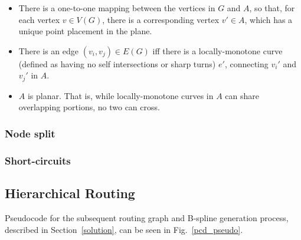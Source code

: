 \begin{mdframed}[backgroundcolor=WhiteSmoke]
\begin{itemize}[leftmargin=*]
    \item There is a one-to-one mapping between the vertices in $G$ and $A$, so that, for each vertex $v\in V(G)$, there is a corresponding vertex $v'\in A$, which has a unique point placement in the plane.
    \item There is an edge $(v_i,v_j) \in E(G)$ iff there is a locally-monotone curve (defined as having no self intersections or sharp turns) $e'$, connecting $v_i'$ and $v_j'$ in $A$. 
    \item $A$ is planar. That is, while locally-monotone curves in $A$ can share overlapping portions, no two can cross.
\end{itemize}
\end{mdframed}

\subsubsection{Node split}
\label{sec:node_split}

\subsubsection{Short-circuits}
\label{sec:short_circuits}

\subsection{Hierarchical Routing}
\label{sec:hierarchical_routing}

Pseudocode for the subsequent routing graph and B-spline generation process, described in Section~\ref{solution}, can be seen in Fig.~\ref{pcd_pseudo}.

